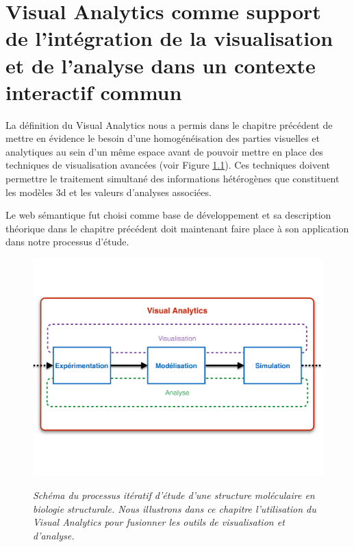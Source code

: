 
\chapter[Interactions directes pour la visualisation et l'analyse]{Visual Analytics comme support de l'intégration de la visualisation et de l'analyse dans un contexte interactif commun}
\label{Sec:visuAna}
\minitoc
\cleardoublepage


La définition du Visual Analytics nous a permis dans le chapitre précédent de mettre en évidence le besoin d'une homogénéisation des parties visuelles et analytiques au sein d'un même espace avant de pouvoir mettre en place des techniques de visualisation avancées (voir Figure \ref{Fig:process_bio_struct_VA}). Ces techniques doivent permettre le traitement simultané des informations hétérogènes que constituent les modèles 3d et les valeurs d'analyses associées.

Le web sémantique fut choisi comme base de développement et sa description théorique dans le chapitre précédent doit maintenant faire place à son application dans notre processus d'étude.

\begin{figure}
  \centering
  {\includegraphics[width=1.0\linewidth]{./figures/ch5/process_bio_struct_VA}}
    \caption{\it Schéma du processus itératif d'étude d'une structure moléculaire en biologie structurale. Nous illustrons dans ce chapitre l'utilisation du Visual Analytics pour fusionner les outils de visualisation et d'analyse.}
  \label{Fig:process_bio_struct_VA}
  \hspace{0.3cm}
\end{figure}


